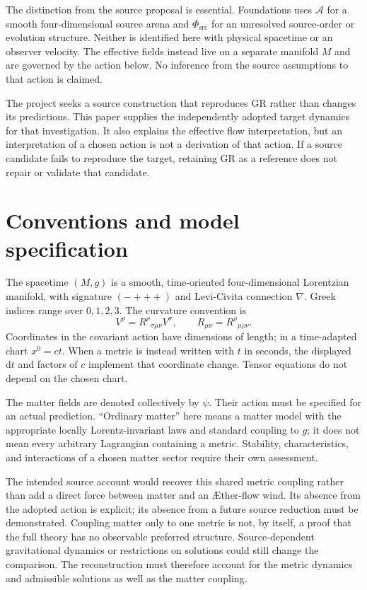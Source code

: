 \documentclass[11pt,oneside]{report}
\newcommand{\Aflow}{\AE{}ther-flow}
\newcommand{\Sub}{\mathcal A}
\newcommand{\PhiSrc}{\Phi_{\mathrm{src}}}
\newcommand{\dd}{\mathrm d}
\theoremstyle{remark}
\numberwithin{definition}{chapter}
\numberwithin{proposition}{chapter}
\numberwithin{remark}{chapter}
\begin{document}
The distinction from the source proposal is essential. Foundations uses $\Sub$ for a smooth four-dimensional source arena and $\PhiSrc$ for an unresolved source-order or evolution structure. Neither is identified here with physical spacetime or an observer velocity. The effective fields instead live on a separate manifold $M$ and are governed by the action below. No inference from the source assumptions to that action is claimed.

The project seeks a source construction that reproduces GR rather than changes its predictions. This paper supplies the independently adopted target dynamics for that investigation. It also explains the effective flow interpretation, but an interpretation of a chosen action is not a derivation of that action. If a source candidate fails to reproduce the target, retaining GR as a reference does not repair or validate that candidate.

\section{Conventions and model specification}
The spacetime $(M,g)$ is a smooth, time-oriented four-dimensional Lorentzian manifold, with signature $(-+++)$ and Levi-Civita connection $\nabla$. Greek indices range over $0,1,2,3$. The curvature convention is
\begin{equation}
[\nabla_\mu,\nabla_\nu]V^\rho=R^\rho{}_{\sigma\mu\nu}V^\sigma,
\qquad R_{\mu\nu}=R^\rho{}_{\mu\rho\nu}.
\end{equation}
Coordinates in the covariant action have dimensions of length; in a time-adapted chart $x^0=ct$. When a metric is instead written with $t$ in seconds, the displayed $\dd t$ and factors of $c$ implement that coordinate change. Tensor equations do not depend on the chosen chart.

The matter fields are denoted collectively by $\psi$. Their action must be specified for an actual prediction. ``Ordinary matter'' here means a matter model with the appropriate locally Lorentz-invariant laws and standard coupling to $g$; it does not mean every arbitrary Lagrangian containing a metric. Stability, characteristics, and interactions of a chosen matter sector require their own assessment.

The intended source account would recover this shared metric coupling rather than add a direct force between matter and an \Aflow{} wind. Its absence from the adopted action is explicit; its absence from a future source reduction must be demonstrated. Coupling matter only to one metric is not, by itself, a proof that the full theory has no observable preferred structure. Source-dependent gravitational dynamics or restrictions on solutions could still change the comparison. The reconstruction must therefore account for the metric dynamics and admissible solutions as well as the matter coupling.
\end{document}
